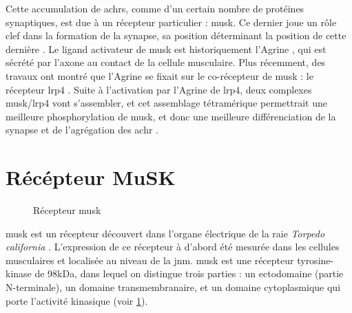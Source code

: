 	Cette accumulation de \glspl{achr}, comme d'un certain nombre de protéines synaptiques, est due à un récepteur particulier : \gls{musk}. Ce dernier joue un rôle clef dans la formation de la synapse, sa position déterminant la position de cette dernière \cite{DeChiara1996, Glass1996}. Le ligand activateur de \gls{musk} est historiquement l'Agrine \cite{Glass1996}, qui est sécrété par l'axone au contact de la cellule musculaire. Plus récemment, des travaux ont montré que l'Agrine se fixait sur le co-récepteur de \gls{musk} : le récepteur \gls{lrp}4 \cite{Zhang2008, Kim2008}. Suite à l'activation par l'Agrine de \gls{lrp}4, deux complexes \gls{musk}/\gls{lrp}4 vont s'assembler, et cet assemblage tétramérique permettrait une meilleure phosphorylation de \gls{musk}, et donc une meilleure différenciation de la synapse et de l'agrégation des \gls{achr} \cite{Zong2012}.
	
\section{Récépteur MuSK}
	\label{sec:IntroMuSK}
	
	\begin{figure}
		\caption{Récepteur \gls{musk}}
		\label{fig:RMuSK}
	\end{figure}

	\gls{musk} est un récepteur découvert dans l'organe électrique de la raie \emph{Torpedo california} \cite{Jennings1993}. L'expression de ce récepteur à d'abord été mesurée dans les cellules musculaires et localisée au niveau de la \gls{jnm}. \gls{musk} est une récepteur tyrosine-kinase de 98kDa, dans lequel on distingue trois parties : un ectodomaine (partie N-terminale), un domaine transmembranaire, et un domaine cytoplasmique qui porte l'activité kinasique (voir \cref{fig:RMuSK}). 
	
